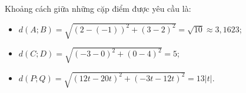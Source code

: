 Khoảng cách giữa những cặp điểm được yêu cầu là:
\begin{itemize}
   \item $d(A;B) = \sqrt{\left(2-(-1)\right)^2+\left(3-2\right)^2} = \boxed{\sqrt{10} \approx 3{,}1623}$;
   \item $d(C;D) = \sqrt{\left(-3-0\right)^2+\left(0-4\right)^2} = \boxed{5}$;
   \item $d(P;Q) = \sqrt{\left(12t-20t\right)^2+\left(-3t-12t\right)^2} = \boxed{13|t|}$.
\end{itemize}

